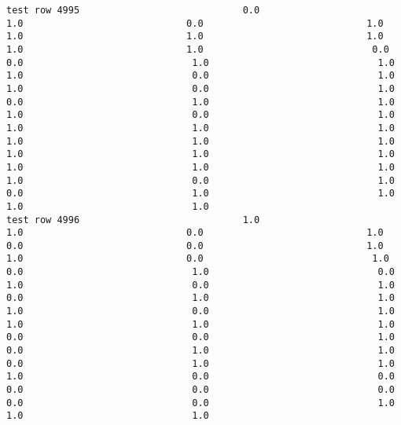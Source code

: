 \documentclass[11pt]{article}
\begin{document}
\begin{verbatim}
test row 4995                             0.0                             1.0                             0.0                             1.0                             1.0                             1.0                             1.0                             1.0                             1.0                              0.0                              0.0                              1.0                              1.0                              1.0                              0.0                              1.0                              1.0                              0.0                              1.0                              0.0                              1.0                              1.0                              1.0                              0.0                              1.0                              1.0                              1.0                              1.0                              1.0                              1.0                              1.0                              1.0                              1.0                              1.0                              1.0                              1.0                              1.0                              1.0                              0.0                              1.0                              0.0                              1.0                              1.0                              1.0                              1.0
test row 4996                             1.0                             1.0                             0.0                             1.0                             0.0                             0.0                             1.0                             1.0                             0.0                              1.0                              0.0                              1.0                              0.0                              1.0                              0.0                              1.0                              0.0                              1.0                              1.0                              1.0                              0.0                              1.0                              1.0                              1.0                              1.0                              0.0                              0.0                              1.0                              0.0                              1.0                              1.0                              0.0                              1.0                              1.0                              1.0                              0.0                              0.0                              0.0                              0.0                              0.0                              0.0                              0.0                              1.0                              1.0                              1.0

\end{verbatim}
\end{document}
